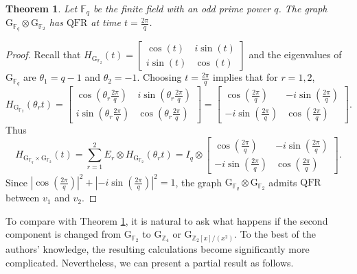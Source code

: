 \documentclass[12pt]{amsart}
\numberwithin{equation}{section}
\newtheorem{thm}{Theorem}[section]
\theoremstyle{definition}
\theoremstyle{definition} \numberwithin{equation}{section}
\newcommand{\G}{\mathrm{G}}
\newcommand{\QFR}{\mathrm{QFR}}
\begin{document}
\begin{thm} \label{QFR finite com ring}
     Let $\mathbb{F}_q$ be the finite field with an odd prime power $q$. The graph $\G_{\mathbb{F}_q} \otimes \G_{\mathbb{F}_2}$ has $\QFR$ at time $t = \frac{2\pi}{q}$.
\end{thm} 
\begin{proof}
  Recall that $H_{\G_{\mathbb{F}_2}}(t) = 
  \begin{bmatrix}
      \cos({t}) & i \sin({t}) \\
      i \sin({t}) & \cos({t})
  \end{bmatrix}$ and the eigenvalues of $\G_{\mathbb{F}_q}$ are $\theta_1 = q - 1$ and $\theta_2 = -1$. Choosing $t = \frac{2\pi}{q}$ implies that for $r = 1, 2$,
  $$
  H_{\G_{\mathbb{F}_2}}(\theta_r t) = 
  \begin{bmatrix}
      \cos(\theta_r \frac{2\pi}{q}) & i \sin(\theta_r \frac{2\pi}{q}) \\
      i \sin(\theta_r \frac{2\pi}{q}) & \cos(\theta_r \frac{2\pi}{q}) 
  \end{bmatrix}
  =
  \begin{bmatrix}
      \cos(\frac{2\pi}{q}) & -i \sin( \frac{2\pi}{q}) \\
      -i \sin( \frac{2\pi}{q}) & \cos(\frac{2\pi}{q}) 
  \end{bmatrix}.
  $$
    Thus 
    \[
H_{\G_{\mathbb{F}_q} \times \G_{\mathbb{F}_2}}(t) = \sum_{r = 1}^2 E_r \otimes H_{\G_{\mathbb{F}_2}}(\theta_r t) = I_q \otimes \begin{bmatrix}
      \cos(\frac{2\pi}{q}) & -i \sin( \frac{2\pi}{q}) \\
      -i \sin( \frac{2\pi}{q}) & \cos(\frac{2\pi}{q}) 
  \end{bmatrix}. 
\]
Since $|\cos(\frac{2\pi}{q})|^2 + |-i \sin( \frac{2\pi}{q})|^2 = 1$, the graph $\G_{\mathbb{F}_q} \otimes \G_{\mathbb{F}_2}$ admits $\QFR$ between $v_1$ and $v_2$.
\end{proof}

To compare with Theorem \ref{QFR finite com ring}, it is natural to ask what happens if the second component is changed from $\G_{\mathbb{F}_2}$ to $\G_{\mathbb{Z}_4}$ or $\G_{\mathbb{Z}_{2} [ x ] /(x^2)}$. To the best of the authors’ knowledge, the resulting calculations become significantly more complicated. Nevertheless, we can present a partial result as follows. 
\end{document}

